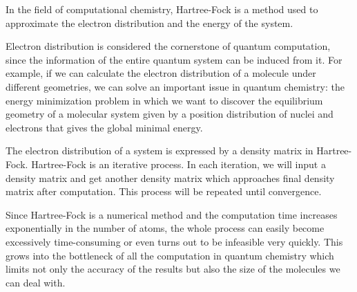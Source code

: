 \documentclass[twoside]{article}
\begin{document}
In the field of computational chemistry, Hartree-Fock is a method used to approximate the electron distribution and the energy of the system. 


Electron distribution is considered the cornerstone of quantum computation, since the information of the entire quantum system can be induced from it. For example, if we can calculate the electron distribution of a molecule under different geometries, we can solve an important issue in quantum chemistry: the energy minimization problem in which we want to discover the equilibrium geometry of a molecular system given by a position distribution of nuclei and electrons that gives the global minimal energy. 

 
 
The electron distribution of a system is expressed by a density matrix in Hartree-Fock.
Hartree-Fock is an iterative process. In each iteration, we will input a density matrix and get another density matrix which approaches final density matrix after computation. This process will be repeated until convergence.

Since Hartree-Fock is a numerical method and the computation time increases exponentially in the number of atoms, the whole process can easily become excessively time-consuming or even turns out to be infeasible very quickly.
This grows into the bottleneck of all the computation in quantum chemistry which limits not only the accuracy of the results but also the size of the molecules we can deal with.




\end{document}
